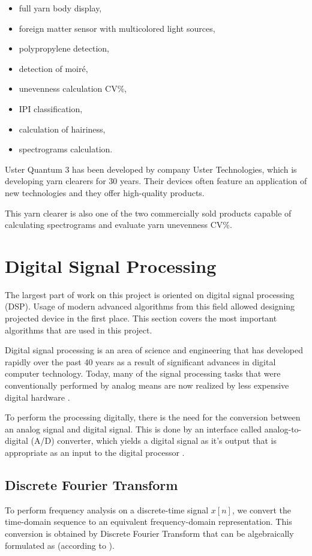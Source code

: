 \documentclass[twoside]{ctuthesis}
\theoremstyle{plain}
\theoremstyle{definition}
\theoremstyle{note}
\begin{document}
\begin{itemize}
	\setlength{\itemsep}{5pt}
	\item full yarn body display,
	\item foreign matter sensor with multicolored light sources,
	\item polypropylene detection,
	\item detection of moiré,
	\item unevenness calculation CV\%,
	\item IPI classification,
	\item calculation of hairiness,
	\item spectrograms calculation.
\end{itemize}

Uster Quantum 3 has been developed by company Uster Technologies, which is developing yarn clearers for 30 years. Their devices often feature an application of new technologies and they offer high-quality products.

This yarn clearer is also one of the two commercially sold products capable of calculating spectrograms and evaluate yarn unevenness CV\%.

 


\section{Digital Signal Processing}
The largest part of work on this project is oriented on digital signal processing (DSP). Usage of modern advanced algorithms from this field allowed designing projected device in the first place. This section covers the most important algorithms that are used in this project.
	
	Digital signal processing is an area of science and engineering that has developed rapidly over the past 40 years as a result of significant advances in digital computer technology. Today, many of the signal processing tasks that were conventionally performed by analog means are now realized by less expensive digital hardware \cite{cite:2}.
	
	To perform the processing digitally, there is the need for the conversion between an analog signal and digital signal. This is done by an interface called analog-to-digital (A/D) converter, which yields a digital signal as it's output that is appropriate as an input to the digital processor \cite{cite:2,cite:3}.
	
\subsection{Discrete Fourier Transform}
\label{sec:DiscreteFourierTransform}
To perform frequency analysis on a discrete-time signal ${x[n]}$, we convert the time-domain sequence to an equivalent frequency-domain representation. This conversion is obtained by Discrete Fourier Transform that can be algebraically formulated as (according to \cite{cite:2,cite:3}).
	
\end{document}
